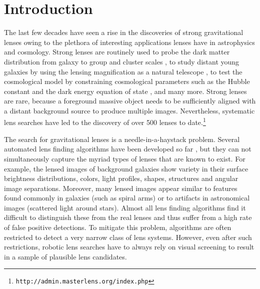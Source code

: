 \documentclass[useAMS,usenatbib,a4paper]{mn2e}
\begin{document}
\section{Introduction}
\label{sec:intro}

The last few decades have seen a rise in the discoveries of strong
gravitational lenses owing to the plethora of interesting applications
lenses have in astrophysics and cosmology. Strong lenses are routinely
used to probe the dark matter distribution from galaxy
\citep[e.g.][]{Koopmans2006,Barnabe2009,Leier2011,Sonnenfeld2015} to group and
cluster scales
\citep[e.g.][]{Limousin2008,Zitrin2011,Oguri2012,More2012,Newman2013}, to
study distant young galaxies by using the lensing magnification as a
natural telescope \citep[e.g.][]{Zitrin2009,Zheng2012,Whitaker2014}, to
test the cosmological model by constraining cosmological parameters such
as the Hubble constant and the dark energy equation of state
\citep[e.g.][]{Suyu2010,Collett2012,Collett2014,Sereno2014}, and many more. Strong
lenses are rare, because a foreground massive object needs to be
sufficiently aligned with a distant background source to produce
multiple images. Nevertheless, systematic lens searches have led to the
discovery of over 500 lenses to
date.\footnote{\texttt{http://admin.masterlens.org/index.php}}

The search for gravitational lenses is a needle-in-a-haystack problem.
Several automated lens finding algorithms have
been developed so far
\citep[e.g.][]{Lenzen2004,Alard2006,Seidel2007,More2012,Brault2014,Gavazzi2014},
but they can not
simultaneously capture the myriad types of lenses that are known to
exist. For example, the lensed images of background galaxies show
variety in their surface brightness distributions, colors, light
profiles, shapes, structures and angular image separations.  Moreover,
many lensed images appear similar to features found commonly in galaxies
(such as spiral arms) or to artifacts in astronomical images (scattered
light around stars).  Almost all lens finding algorithms find it
difficult to distinguish these from the real lenses and thus suffer
from a high rate of false positive detections.  To mitigate this problem,
algorithms are often restricted to detect a very narrow class of lens
systems. However, even after such restrictions, robotic lens searches
have to always rely on visual screening to result in a sample of plausible
lens candidates.
\end{document}
